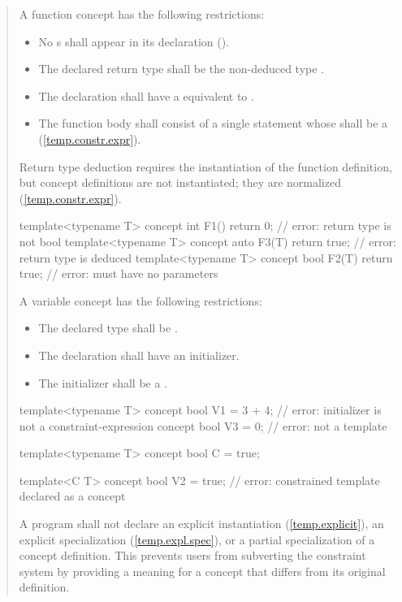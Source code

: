 \begin{quote}
\pnum
A function concept has the following restrictions:
\begin{itemize}
\item No s shall
     appear in its declaration ().
\item The declared return type shall be the non-deduced type .

\item The declaration shall have a 
equivalent to \tcode{()}.

\item The function body shall consist of a single  
statement whose  shall be a
 (\ref{temp.constr.expr}).
\end{itemize}
%
\enternote
Return type deduction requires the instantiation of the function 
definition, but concept definitions are not instantiated; they
are normalized (\ref{temp.constr.expr}).
\exitnote
%
\enterexample
\begin{codeblock}
template<typename T> 
  concept int F1() { return 0; }      // error: return type is not bool
template<typename T> 
  concept auto F3(T) { return true; } // error: return type is deduced
template<typename T> 
  concept bool F2(T) { return true; } // error: must have no parameters
\end{codeblock}
\exitexample

\pnum
A variable concept has the following restrictions:
\begin{itemize}
\item The declared type shall be .
\item The declaration shall have an initializer.
\item The initializer shall be a .
\end{itemize}
%
\enterexample
\begin{codeblock}
template<typename T> 
  concept bool V1 = 3 + 4; // error: initializer is not a constraint-expression
concept bool V3 = 0;       // error: not a template

template<typename T> concept bool C = true;

template<C T> 
  concept bool V2 = true;  // error: constrained template declared as a concept
\end{codeblock}
\exitexample

\pnum
A program shall not declare an explicit instantiation (\ref{temp.explicit}), 
an explicit specialization (\ref{temp.expl.spec}), or a partial specialization
of a concept definition.
%
\enternote
This prevents users from subverting the constraint system by providing a 
meaning for a concept that differs from its original definition.
\exitnote

\end{quote}
